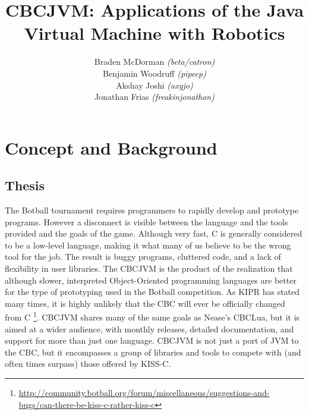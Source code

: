 \documentclass[12pt,letterpaper]{article}
\title{CBCJVM: Applications of the Java Virtual Machine with Robotics}
\author{Braden McDorman \textit{(beta/catron)}\\
Benjamin Woodruff \textit{(pipeep)}\\
Akshay Joshi \textit{(axyjo)}\\
Jonathan Frias \textit{(freakinjonathan)}}
\newcommand{\urlfootnote}[1]{\footnote{\url{#1}}}
\begin{document}
\makeatletter
\noindent\begin{minipage}[l]{.8\textwidth}\begin{flushleft}\begin{small}
\textbf{\@title}\vspace{.75em}

\@author\vspace{.5em}

\authInfo
\end{small}\end{flushleft}\end{minipage}\vspace{.25in}
\begin{center}
\begin{Large}
\textbf{\@title}
\end{Large}
\end{center}
\makeatother

\section{Concept and Background}

\subsection{Thesis}

The Botball tournament requires programmers to rapidly develop and prototype programs. However a disconnect is visible between the language and the tools provided and the goals of the game. Although very fast, C is generally considered to be a low-level language, making it what many of us believe to be the wrong tool for the job. The result is buggy programs, cluttered code, and a lack of flexibility in user libraries. The CBCJVM is the product of the realization that although slower, interpreted Object-Oriented programming languages are better for the type of prototyping used in the Botball competition. As KIPR has stated many times, it is highly unlikely that the CBC will ever be officially changed from C \urlfootnote{http://community.botball.org/forum/miscellaneous/suggestions-and-bugs/can-there-be-kiss-c-rather-kiss-c}. CBCJVM shares many of the same goals as Nease's CBCLua, but it is aimed at a wider audience, with monthly releases, detailed documentation, and support for more than just one language. CBCJVM is not just a port of JVM to the CBC, but it encompasses a group of libraries and tools to compete with (and often times surpass) those offered by KISS-C.
\end{document}
